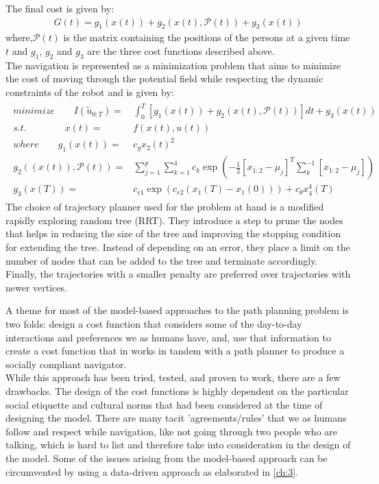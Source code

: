 The final cost is given by: 
\begin{align}
G(t) = g_{1}(x(t)) + g_{2}(x(t), \mathcal{P}(t)) + g_{3}(x(t))
\end{align}
where,$\mathcal{P}(t)$ is the matrix containing the positions of the persons at a given time $t$ and $g_{1}$, $g_{2}$ and $g_{3}$ are the three cost functions described above.\\
The navigation is represented as a minimization problem that aims to minimize the cost of moving through the potential field while respecting the dynamic constraints of the robot and is given by:
\begin{align}
\begin{split}
minimize \qquad I(\tilde{u}_{0:T}) = &\int_{0}^{T} [g_{1}(x(t)) + g_{2}(x(t), \mathcal{P}(t))]dt + g_{3}(x(t))\\
s.t. \qquad \qquad \dot{x}(t) = & f(x(t),u(t)) \\
where \qquad g_{1}(x(t)) = &c_{y}x_{2}(t)^{2}\\
g_{2}((x(t)), \mathcal{P}(t)) = &\sum_{j=1}^{p} \sum_{k=1}^{4} c_{k}\exp(-\frac{1}{2}[x_{1:2} - \mu_{j}]^{T}\sum^{-1}_{k}[x_{1:2} - \mu_{j}])\\
g_{3}(x(T)) = & c_{e1}\exp(c_{e2}(x_{1}(T) - x_{1}(0))) + c_{\theta}x_{4}^{4}(T)
\end{split}
\end{align}
The choice of trajectory planner used for the problem at hand is a modified rapidly exploring random tree (RRT). They introduce a step to prune the nodes that helps in reducing the size of the tree and improving the stopping condition for extending the tree. Instead of depending on an error, they place a limit on the number of nodes that can be added to the tree and terminate accordingly. Finally, the trajectories with a smaller penalty are preferred over trajectories with newer vertices.
\vspace{3cm}
\par
A theme for most of the model-based approaches to the path planning problem is two folds: design a cost function that considers some of the day-to-day interactions and preferences we as humans have, and, use that information to create a cost function that in works in tandem with a path planner to produce a socially compliant navigator.\\
While this approach has been tried, tested, and proven to work, there are a few drawbacks. The design of the cost functions is highly dependent on the particular social etiquette and cultural norms that had been considered at the time of designing the model. There are many tacit 'agreements/rules' that we as humans follow and respect while navigation, like not going through two people who are talking, which is hard to list and therefore take into consideration in the design of the model. Some of the issues arising from the model-based approach can be circumvented by using a data-driven approach as elaborated in \autoref{ch:3}.












